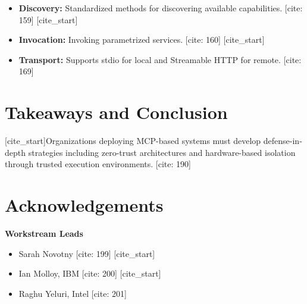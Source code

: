 \documentclass[11pt]{article}
\begin{document}
\begin{itemize}
    [cite_start]\item \textbf{Discovery:} Standardized methods for discovering available capabilities. [cite: 159]
    [cite_start]\item \textbf{Invocation:} Invoking parametrized services. [cite: 160]
    [cite_start]\item \textbf{Transport:} Supports stdio for local and Streamable HTTP for remote. [cite: 169]
\end{itemize}

\section{Takeaways and Conclusion}
[cite_start]Organizations deploying MCP-based systems must develop defense-in-depth strategies including zero-trust architectures and hardware-based isolation through trusted execution environments. [cite: 190]

\newpage
\section*{Acknowledgements}
\textbf{Workstream Leads}
\begin{itemize}
    [cite_start]\item Sarah Novotny [cite: 199]
    [cite_start]\item Ian Molloy, IBM [cite: 200]
    [cite_start]\item Raghu Yeluri, Intel [cite: 201]
\end{itemize}
\end{document}
